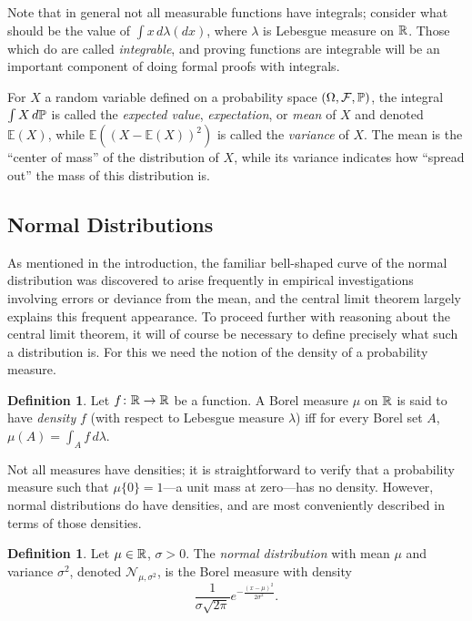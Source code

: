 \documentclass[leqno]{article}
\theoremstyle{definition}
\newtheorem{definition}[theorem]{Definition}
\renewcommand{\E}{\mathbb E}
\begin{document}
Note that in general not all measurable functions have integrals; consider what should be the value of $\int x \, d\lambda(dx)$, where $\lambda$ is Lebesgue measure on $\R$. Those which do are called {\em integrable}, and proving functions are integrable will be an important component of doing formal proofs with integrals.

For $X$ a random variable defined on a probability space $(\Omega, \mathcal F, \P)$, the integral $\int X \, d\P$ is called the {\em expected value}, {\em expectation}, or {\em mean} of $X$ and denoted $\E(X)$, while $\E((X - \E(X))^2)$ is called the {\em variance} of $X$. The mean is the ``center of mass'' of the distribution of $X$, while its variance indicates how ``spread out'' the mass of this distribution is.

\subsection{Normal Distributions}

As mentioned in the introduction, the familiar bell-shaped curve of the normal distribution was discovered to arise frequently in empirical investigations involving errors or deviance from the mean, and the central limit theorem largely explains this frequent appearance. To proceed further with reasoning about the central limit theorem, it will of course be necessary to define precisely what such a distribution is. For this we need the notion of the density of a probability measure.

\begin{definition}
Let $f\colon \R \rightarrow \R$ be a function. A Borel measure $\mu$ on $\R$ is said to have {\em density} $f$ (with respect to Lebesgue measure $\lambda$) iff for every Borel set $A$, $\mu(A) = \int_A f \, d\lambda$.
\end{definition}

Not all measures have densities; it is straightforward to verify that a probability measure such that $\mu \{0\} = 1$---a unit mass at zero---has no density. However, normal distributions do have densities, and are most conveniently described in terms of those densities.

\begin{definition}
Let $\mu \in \R$, $\sigma > 0$. The {\em normal distribution} with mean $\mu$ and variance $\sigma^2$, denoted $\mathcal N_{\mu, \sigma^2}$, is the Borel measure with density
\[ \frac{1}{\sigma \sqrt{2\pi}} e^{-\frac{(x-\mu)^2}{2\sigma^2}}. \]
\end{definition}
\end{document}

